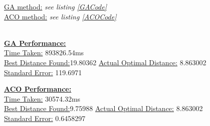 \documentclass[11pt,a4paper,final]{article}
\begin{document}
	\underline{GA method:} \textit{see listing \ref{GACode}}\\
	\underline{ACO method:} \textit{see listing \ref{ACOCode}}\\
	\hspace{0pt}\\
	\begin{minipage}{0.475\textwidth}
		\textbf{\underline{GA Performance:}}\\
		\underline{Time Taken:} 893826.54ms\\
		\underline{Best Distance Found:}{\hspace{2pt}}19.80362
		\underline{Actual Optimal Distance:} 8.863002\\
		\underline{Standard Error:} 119.6971
	\end{minipage}
	\begin{minipage}{0.475\textwidth}
		\textbf{\underline{ACO Performance:}}\\
		\underline{Time Taken:} 30574.32ms\\
		\underline{Best Distance Found:}{\hspace{2pt}}9.75988
		\underline{Actual Optimal Distance:} 8.863002\\
		\underline{Standard Error:} 0.6458297
	\end{minipage}
	
\end{document}
